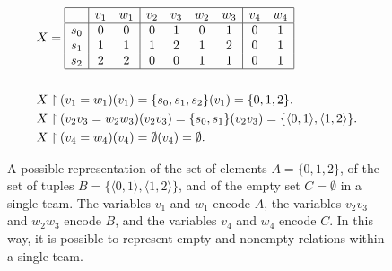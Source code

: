 \documentclass{article}
\theoremstyle{definition}
\begin{document}
\begin{figure}
\begin{align*}
& X = \begin{array}{| c | c c | c c c c | c c |}
\hline
& v_1 & w_1 & v_2 & v_3 & w_2 & w_3 & v_4 & w_4\\
\hline
s_0 & 0 & 0 & 0 & 1 & 0 & 1 & 0 & 1\\
s_1 & 1 & 1 & 1 & 2 & 1 & 2 & 0 & 1\\
s_2 & 2 & 2 & 0 & 0 & 1 & 1 & 0 & 1\\
\hline
\end{array}\\
& \\
& X\upharpoonright (v_1 = w_1)(v_1) = \{s_0,s_1, s_2\}(v_1) = \{0,1,2\}.\\
& X\upharpoonright (v_2 v_3 = w_2 w_3)(v_2 v_3) = \{s_0, s_1\}(v_2 v_3) = \{\langle 0, 1\rangle, \langle 1, 2\rangle\}.\\
& X\upharpoonright (v_4 = w_4)(v_4) = \emptyset(v_4) = \emptyset.
\end{align*}
\caption{A possible representation of the set of elements $A = \{0,1,2\}$, of the set of tuples $B = \{\langle 0, 1\rangle, \langle 1, 2\rangle\}$, and of the empty set $C = \emptyset$ in a single team. The variables $v_1$ and $w_1$ encode $A$, the variables $v_2 v_3$ and $w_2 w_3$ encode $B$, and the variables $v_4$ and $w_4$ encode $C$. In this way, it is possible to represent empty and nonempty relations within a single team.}
\label{fig:reptuples}
\end{figure}
\end{document}
